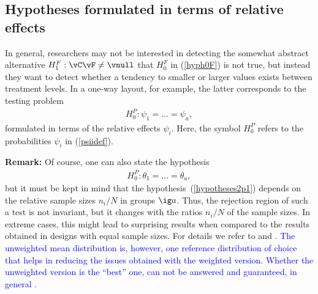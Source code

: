 \subsection{Hypotheses formulated in terms of relative effects} \label{nullh0P}

In general, researchers may not be interested in detecting the somewhat 
abstract alternative $H_1^F: \vC \vF \neq \vnull$ that $H_0^F$ in 
(\ref{hyph0F}) is not true, but instead they want to detect whether a tendency 
to smaller or larger values exists between treatment levels. In a one-way 
layout, for example, the latter corresponds to the testing problem 
\begin{eqnarray} 
H_0^P: \psi_1 = \ldots = \psi_a,  \label{hypotheses1p1}
\end{eqnarray}
formulated in terms of the relative effects $\psi_i$. Here, the symbol $H_0^P$ 
refers to the probabilities $\psi_i$ in (\ref{psiidef}). 

\textbf{Remark:} 
Of course, one can also state the hypothesis 
\begin{eqnarray} 
H_0^P: \theta_1 = \ldots = \theta_a, \label{hypotheses2p1}
\end{eqnarray}
but it must be kept in mind that the hypothesis~(\ref{hypotheses2p1}) depends 
on the relative sample sizes $n_i/N$ in groups $\ig a$. Thus, the rejection 
region of such a test is not invariant, but it changes with the ratios $n_i/N$ of 
the sample sizes. In extreme cases, this might lead to surprising results when 
compared to the results obtained in designs with equal sample sizes. For 
details we refer to \cite{brunner2020ranks} and \cite{brunner2019rank}. \textcolor{blue}{The unweighted mean distribution is, however, one reference distribution of choice that helps in reducing the issues obtained with the weighted version. Whether the unweighted version is the ``best'' one, can not be answered and guaranteed, in general  \citep{zimmermann2022pseudo}.}



